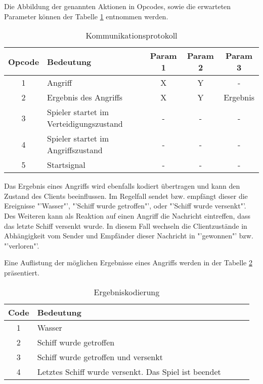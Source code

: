 Die Abbildung der genannten Aktionen in Opcodes, sowie die erwarteten Parameter können der Tabelle \ref{tbl:Kommunikationsprotokoll} entnommen werden.

\begin{table}[H]
	\centering
	\begin{tabular}{|c|l|c|c|c|}
		\hline
		\textbf{Opcode}	&	\textbf{Bedeutung}	&	\textbf{Param 1}	&	\textbf{Param 2}	&	\textbf{Param 3} \\
		\hline
		\hline
		1				&	Angriff				&	X						&	Y				&	-	\\
		\hline
		2				&	Ergebnis des Angriffs	&	X					&	Y				&	Ergebnis	\\
		\hline
		3				&	Spieler startet im Verteidigungszustand	&	-	&	-				&	-	\\
		\hline
		4				&	Spieler startet im Angriffszustand	&	-		&	-				&	-	\\
		\hline
		5				&	Startsignal			&	-						&	-				&	-	\\
		\hline
	\end{tabular}
	\caption{Kommunikationsprotokoll}
	\label{tbl:Kommunikationsprotokoll}
\end{table}

Das Ergebnis eines Angriffs wird ebenfalls kodiert übertragen und kann den Zustand des Clients beeinflussen.
Im Regelfall sendet bzw. empfängt dieser die Ereignisse "'Wasser"', "'Schiff wurde getroffen"', oder "'Schiff wurde versenkt"'.
Des Weiteren kann als Reaktion auf einen Angriff die Nachricht eintreffen, dass das letzte Schiff versenkt wurde.
In diesem Fall wechseln die Clientzustände in Abhängigkeit vom Sender und Empfänder dieser Nachricht in "'gewonnen"' bzw. "'verloren"'.

Eine Auflistung der möglichen Ergebnisse eines Angriffs werden in der Tabelle \ref{tbl:Ergebniskodierung} präsentiert.

\begin{table}[H]
	\centering
	\begin{tabular}{|c|l|c|c|c|}
		\hline
		\textbf{Code}	&	\textbf{Bedeutung} \\
		\hline
		\hline
		1				&	Wasser	\\
		\hline
		2				&	Schiff wurde getroffen	\\
		\hline
		3				&	Schiff wurde getroffen und versenkt	\\
		\hline
		4				&	Letztes Schiff wurde versenkt. Das Spiel ist beendet	\\
		\hline
	\end{tabular}
	\caption{Ergebniskodierung}
	\label{tbl:Ergebniskodierung}
\end{table}
